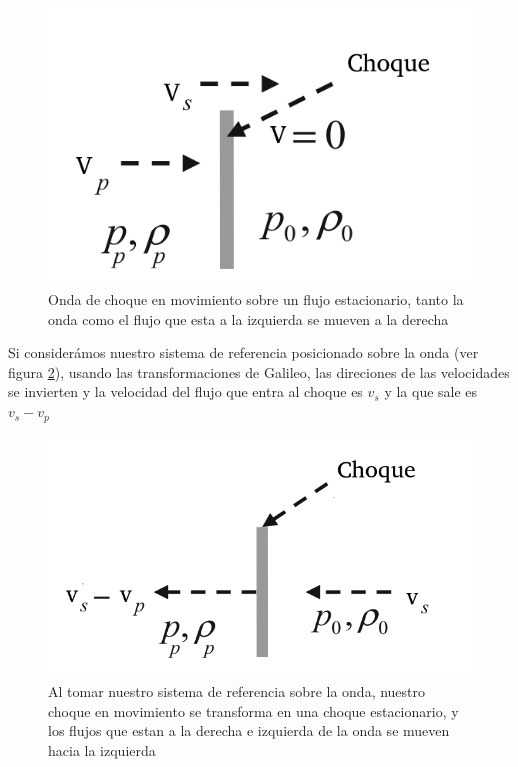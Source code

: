 \documentclass[12pt,a4paper]{book}
\begin{document}
\begin{figure}
  \centering
  \includegraphics[scale=0.7]{./Figuras/Teoria/move_shock.png}
  \caption{Onda de choque en movimiento sobre un flujo estacionario, tanto la onda como el flujo que esta a la izquierda se mueven a la derecha}\label{fig_move_shock}
\end{figure}
  

Si considerámos nuestro sistema de referencia posicionado sobre la onda (ver figura \ref{fig_stationary_shock}), usando las transformaciones de Galileo, las direciones de las velocidades
se invierten y la velocidad del flujo que entra al choque es $v_s$ y la que sale es $v_s-v_p$

\begin{figure} 
  \centering
  \includegraphics[scale=0.7]{./Figuras/Teoria/stationary_shock.png}
  \caption{Al tomar nuestro sistema de referencia sobre la onda, nuestro choque en movimiento se transforma en una choque estacionario, y los
  flujos que estan a la derecha e izquierda de la onda se mueven hacia la izquierda } \label{fig_stationary_shock}
\end{figure}
\end{document}
